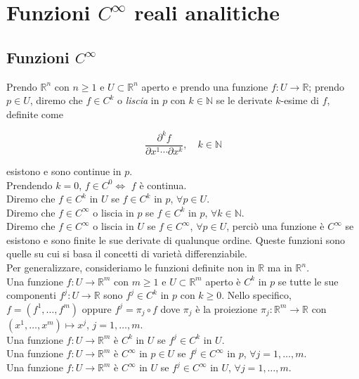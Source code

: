 \section{Funzioni $ C^{\infty} $ reali analitiche}

\subsection{Funzioni $ C^{\infty} $}

Prendo $ \mathbb{R}^{n} $ con $ n \geq 1 $ e $ U \subset \mathbb{R}^{n} $ aperto e prendo una funzione $ f : U \to \mathbb{R} $; prendo $ p \in U $, diremo che $ f \in C^{k} $ o \textit{liscia} in $ p $ con $ k \in \mathbb{N} $ se le derivate $ k $-esime di $ f $, definite come

\begin{equation}
	\dfrac{\partial^{k} f}{\partial x^{1} \cdots \partial x^{k}}, \quad k \in \mathbb{N}
\end{equation}

esistono e sono continue in $ p $.\\
Prendendo $ k = 0 $, $ f \in C^{0} \iff $ $ f $ è continua.\\
Diremo che $ f \in C^{k} $ in $ U $ se $ f \in C^{k} $ in $ p $, $ \forall p \in U $.\\
Diremo che $ f \in C^{\infty} $ o liscia in $ p $ se $ f \in C^{k} $ in $ p $, $ \forall k \in \mathbb{N} $.\\
Diremo che $ f \in C^{\infty} $ o liscia in $ U $ se $ f \in C^{\infty} $, $ \forall p \in U $, perciò una funzione è $ C^{\infty} $ se esistono e sono finite le sue derivate di qualunque ordine. Queste funzioni sono quelle su cui si basa il concetti di varietà differenziabile.\\

Per generalizzare, consideriamo le funzioni definite non in $ \mathbb{R} $ ma in $ \mathbb{R}^{n} $.\\
Una funzione $ f : U \to \mathbb{R}^{m} $ con $ m \geq 1 $ e $ U \subset \mathbb{R}^{m} $ aperto è $ C^{k} $ in $ p $ se tutte le sue componenti $ f^{j} : U \to \mathbb{R} $ sono $ f^{j} \in C^{k} $ in $ p $ con $ k \geq 0 $. Nello specifico, $ f = (f^{1}, \dots, f^{m}) $ oppure $ f^{j} = \pi_{j} \circ f $ dove $ \pi_{j} $ è la proiezione $ \pi_{j} : \mathbb{R}^{m} \to \mathbb{R} $ con $ (x^{1}, \dots, x^{m}) \mapsto x^{j} $, $ j = 1, \dots, m $.\\
Una funzione $ f : U \to \mathbb{R}^{m} $ è $ C^{k} $ in $ U $ se $ f^{j} \in C^{k} $ in $ U $.\\
Una funzione $ f : U \to \mathbb{R}^{m} $ è $ C^{\infty} $ in $ p \in U $ se $ f^{j} \in C^{\infty} $ in $ p $, $ \forall j = 1, \dots, m $.\\
Una funzione $ f : U \to \mathbb{R}^{m} $ è $ C^{\infty} $ in $ U $ se $ f^{j} \in C^{\infty} $ in $ U $, $ \forall j = 1, \dots, m $.

